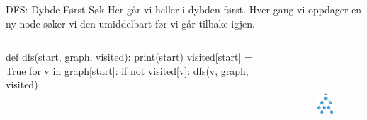 \begin{frame}[fragile]{DFS: Dybde-Først-Søk}
    Her går vi heller i dybden først. Hver gang vi oppdager en ny node søker vi den umiddelbart før vi går tilbake igjen.
    \begin{columns}
        \begin{column}{0.5\textwidth}
            \begin{python}
def dfs(start, graph, visited):
    print(start)
    visited[start] = True
    for v in graph[start]:
        if not visited[v]:
            dfs(v, graph, visited)
            \end{python}
        \end{column}
        \begin{column}{0.45\textwidth}
            \begin{figure}
                \centering
                \includegraphics[height=4cm]{images/dfs.png}
            \end{figure}   
        \end{column}
    \end{columns}
\end{frame}